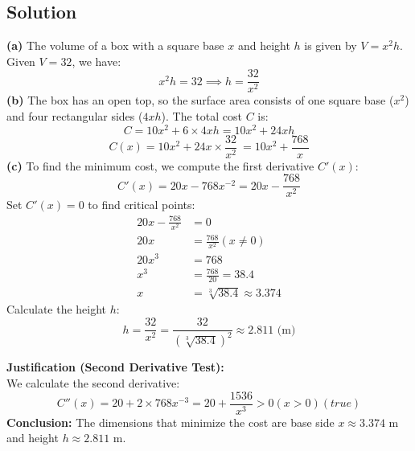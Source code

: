 \subsection*{Solution}
\textbf{(a)} 
    The volume of a box with a square base $x$ and height $h$ is given by $V = x^2h$.
    Given $V = 32$, we have:
    \[
    x^2h = 32 \implies h = \frac{32}{x^2}
    \]
\textbf{(b)} 
    The box has an open top, so the surface area consists of one square base ($x^2$) and four rectangular sides ($4xh$).
    The total cost $C$ is:
    \[
    C = 10x^2 + 6\times4xh = 10x^2 + 24xh
    \]
    \[
    C(x) = 10x^2 + 24x\times\frac{32}{x^2}\ = 10x^2 + \frac{768}{x}
    \]
\textbf{(c)} 
    To find the minimum cost, we compute the first derivative $C'(x)$:
    \[
    C'(x) = 20x - 768x^{-2} = 20x - \frac{768}{x^2}
    \]
    Set $C'(x) = 0$ to find critical points:
    \[
    \begin{aligned}
        20x - \frac{768}{x^2} &= 0 \\
        20x &= \frac{768}{x^2} (x\ne 0) \\
        20x^3 &= 768 \\
        x^3 &= \frac{768}{20} = 38.4 \\
        x &= \sqrt[3]{38.4} \approx 3.374
    \end{aligned}
    \]
    Calculate the height $h$:
    \[
    h = \frac{32}{x^2} = \frac{32}{(\sqrt[3]{38.4})^2} \approx 2.811 \text{ (m)}
    \]
    
    \textbf{Justification (Second Derivative Test):} \\
    We calculate the second derivative:
    \[
    C''(x) = 20 + 2\times 768x^{-3} = 20 + \frac{1536}{x^3}>0(x>0)(true)
    \]
    \textbf{Conclusion:} The dimensions that minimize the cost are base side $x \approx 3.374$ m and height $h \approx 2.811$ m.
\pagebreak
